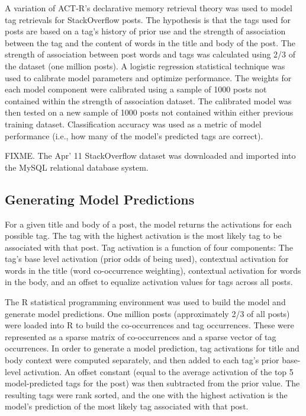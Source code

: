 \documentclass[10pt,letterpaper]{article}
\begin{document}
A variation of ACT-R's declarative memory retrieval theory \cite{Anderson2004} was used to model tag retrievals for StackOverflow posts.
The hypothesis is that the tags used for posts are based on a tag's history of prior use and the strength of association between the tag and the content of words in the title and body of the post.
The strength of association between post words and tags was calculated using 2/3 of the dataset (one million posts).
A logistic regression statistical technique was used to calibrate model parameters and optimize performance.
The weights for each model component were calibrated using a sample of \num{1000} posts not contained within the strength of association dataset.
The calibrated model was then tested on a new sample of \num{1000} posts not contained within either previous training dataset.
Classification accuracy was used as a metric of model performance (i.e., how many of the model's predicted tags are correct).

FIXME. The Apr' 11 StackOverflow dataset \cite{DataDump2011} was downloaded and imported into the MySQL relational database system.

\subsection{Generating Model Predictions}

For a given title and body of a post, the model returns the activations for each possible tag.
The tag with the highest activation is the most likely tag to be associated with that post.
Tag activation is a function of four components:
The tag's base level activation (prior odds of being used),
contextual activation for words in the title (word co-occurrence weighting),
contextual activation for words in the body,
and an offset to equalize activation values for tags across all posts.

The R statistical programming environment was used to build the model and generate model predictions.
One million posts (approximately 2/3 of all posts) were loaded into R to build the co-occurrences and tag occurrences.
These were represented as a sparse matrix of co-occurrences and a sparse vector of tag occurrences.
In order to generate a model prediction, tag activations for title and body context were computed separately, and then added to each tag's prior base-level activation.
An offset constant (equal to the average activation of the top 5 model-predicted tags for the post) was then subtracted from the prior value.
The resulting tags were rank sorted, and the one with the highest activation is the model's prediction of the most likely tag associated with that post.
\end{document}
